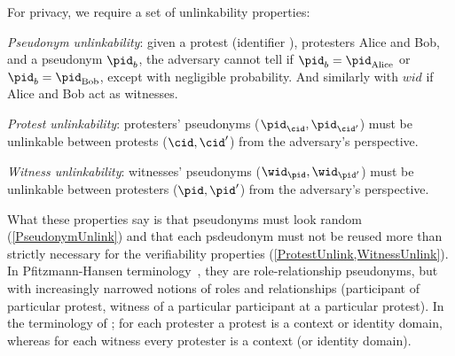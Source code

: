 For privacy, we require a set of unlinkability properties:%
\label{privacy-properties}
\begin{requirements}[P]
\item\label{PseudonymUnlink} \emph{Pseudonym unlinkability}: given a protest 
  (identifier \cid), protesters Alice and Bob, and a pseudonym \(\pid_b\), the 
  adversary cannot tell if \(\pid_b = \pid_{\text{Alice}}\) or \(\pid_b = 
    \pid_{\text{Bob}}\), except with negligible probability. And similarly with $wid$ if Alice and Bob act as witnesses.
\item\label{ProtestUnlink} \emph{Protest unlinkability}: protesters' pseudonyms 
  (\(\pid_\cid, \pid_{\cid'}\)) must be unlinkable between protests (\(\cid, 
    \cid'\)) from the adversary's perspective.
\item\label{WitnessUnlink}\emph{Witness unlinkability}:  witnesses' pseudonyms 
  (\(\wid_\pid, \wid_{\pid'}\)) must be unlinkable between protesters (\(\pid, 
    \pid'\)) from the adversary's perspective.
\end{requirements}

What these properties say is that pseudonyms must look random 
(\cref{PseudonymUnlink}) and that each psdeudonym must not be reused
more than strictly necessary for the verifiability properties 
(\cref{ProtestUnlink,WitnessUnlink}). In Pfitzmann-Hansen
terminology~\cite{pfitzmann-hansen}, they are role-relationship
pseudonyms, but with increasingly narrowed notions of roles and
relationships (participant of particular protest, witness of a
particular participant at a particular protest).
In the terminology of \textcite{SybilFreePseudonyms}; for each protester a 
protest is a context or identity domain, whereas for each witness every 
protester is a context (or identity domain).
